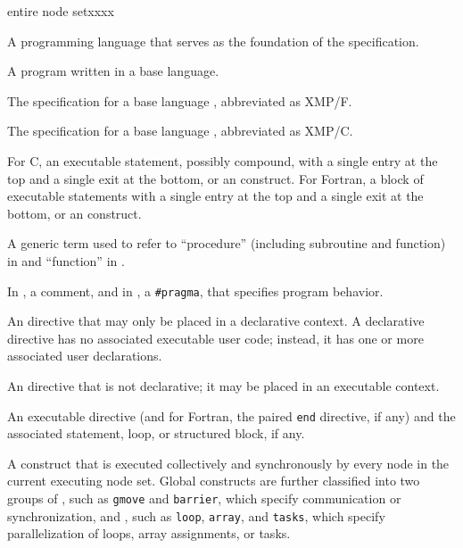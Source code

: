 \begin{namelist}{entire node setxxxx}


 A programming language that serves as the foundation of the {\XMP}
 specification.


 A program written in a base language.

\gitem{\XMPF}

 The {\XMP} specification for a base language {\Fort}, abbreviated as
 XMP/F.

\gitem{\XMPC}

 The {\XMP} specification for a base language {\C}, abbreviated as
 XMP/C.


 For C, an executable statement, possibly compound, with a single entry
 at the top and a single exit at the bottom, or an {\XMP} construct.
 For Fortran, a block of executable statements with a single entry at
 the top and a single exit at the bottom, or an {\XMP} construct.


 A generic term used to refer to ``procedure'' (including subroutine and
 function) in {\XMPF} and ``function'' in {\XMPC}.


 In {\XMPF}, a comment, and in {\XMPC}, a {\tt \#pragma}, that specifies
 {\XMP} program behavior.


 An {\XMP} directive that may only be placed in a declarative context. A
 declarative directive has no associated executable user code; instead,
 it has one or more associated user declarations. 


 An {\XMP} directive that is not declarative; it may be placed in an
 executable context.


 An {\XMP} executable directive (and for Fortran, the paired {\tt end}
 directive, if any) and the associated statement, loop, or structured
 block, if any.



 A construct that is executed collectively and synchronously by every
 node in the current executing node set. Global constructs are further 
 classified into two groups of {\it {}}, such as {\tt gmove} and {\tt barrier}, which specify
 communication or synchronization, and {\it {}}, such as {\tt loop}, {\tt array}, and {\tt tasks}, which
 specify parallelization of loops, array assignments, or tasks.


\end{namelist}
